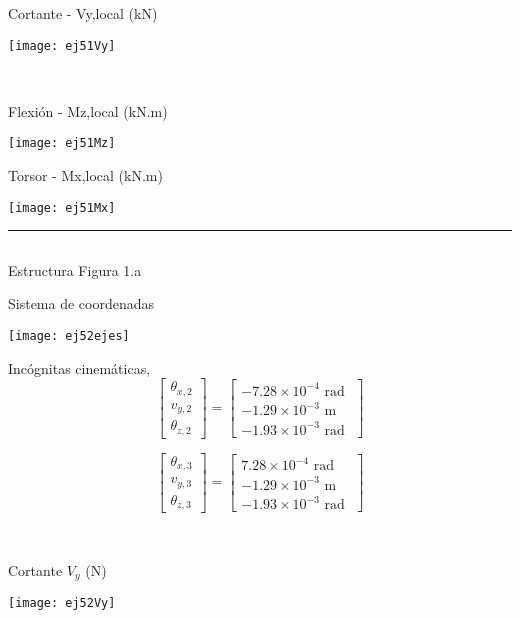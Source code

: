 \vspace{5mm}

\begin{minipage}{0.45\textwidth}
Cortante - Vy,local (kN)

\texttt{[image: ej51Vy]}
\end{minipage}
~
\begin{minipage}{0.45\textwidth}
Flexión - Mz,local (kN.m)

\texttt{[image: ej51Mz]}
\end{minipage}


\begin{center}
Torsor - Mx,local (kN.m)

\texttt{[image: ej51Mx]}
\end{center}




\hrule 

\subsection{}


Estructura Figura 1.a

Sistema de coordenadas
\begin{center}
\texttt{[image: ej52ejes]}
\end{center}


\begin{minipage}{0.45\textwidth}
	Incógnitas cinemáticas,
$$
\left[
\begin{matrix}
\theta_{x,2} \\
v_{y,2} \\
\theta_{z,2}
\end{matrix}
\right]
=
\left[
\begin{matrix}
-7.28\times 10^{-4} \text{ rad }\\
-1.29\times 10^{-3} \text{ m }\\
-1.93\times 10^{-3} \text{ rad }
\end{matrix}
\right]
$$

$$
\left[
\begin{matrix}
\theta_{x,3} \\
v_{y,3} \\
\theta_{z,3}
\end{matrix}
\right]
=
\left[
\begin{matrix}
 7.28\times 10^{-4} \text{ rad }\\
-1.29\times 10^{-3} \text{ m }\\
-1.93\times 10^{-3} \text{ rad }
\end{matrix}
\right]
$$
\end{minipage}
~
\begin{minipage}{0.45\textwidth}
Cortante $V_y$ (N)

\texttt{[image: ej52Vy]}
\end{minipage}


